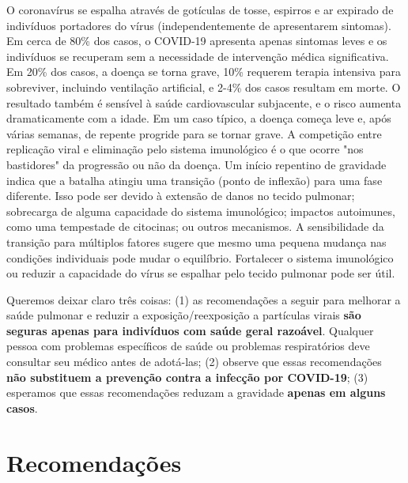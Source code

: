 \documentclass[onecolumn,journal]{IEEEtran}
\begin{document}
\begin{multicols}{2}
O coronavírus se espalha através de gotículas de tosse, espirros e ar expirado de indivíduos portadores do vírus (independentemente de apresentarem sintomas). Em cerca de 80\% dos casos, o COVID-19 apresenta apenas sintomas leves e os indivíduos se recuperam sem a necessidade de intervenção médica significativa. Em 20\% dos casos, a doença se torna grave, 10\% requerem terapia intensiva para sobreviver, incluindo ventilação artificial, e 2-4\% dos casos resultam em morte. O resultado também é sensível à saúde cardiovascular subjacente, e o risco aumenta dramaticamente com a idade. Em um caso típico, a doença começa leve e, após várias semanas, de repente progride para se tornar grave. A competição entre replicação viral e eliminação pelo sistema imunológico é o que ocorre "nos bastidores" da progressão ou não da doença. Um início repentino de gravidade indica que a batalha atingiu uma transição (ponto de inflexão) para uma fase diferente. Isso pode ser devido à extensão de danos no tecido pulmonar; sobrecarga de alguma capacidade do sistema imunológico; impactos autoimunes, como uma tempestade de citocinas; ou outros mecanismos. A sensibilidade da transição para múltiplos fatores sugere que mesmo uma pequena mudança nas condições individuais pode mudar o equilíbrio. Fortalecer o sistema imunológico ou reduzir a capacidade do vírus se espalhar pelo tecido pulmonar pode ser útil.

Queremos deixar claro três coisas: (1) as recomendações a seguir para melhorar a saúde pulmonar e reduzir a exposição/reexposição a partículas virais \textbf{são seguras apenas para indivíduos com saúde geral razoável}. Qualquer pessoa com problemas específicos de saúde ou problemas respiratórios deve consultar seu médico antes de adotá-las; (2) observe que essas recomendações \textbf{não substituem a prevenção contra a infecção por COVID-19}; (3) esperamos que essas recomendações reduzam a gravidade \textbf{apenas em alguns casos}.

\section*{Recomendações}


\end{multicols}
\end{document}
